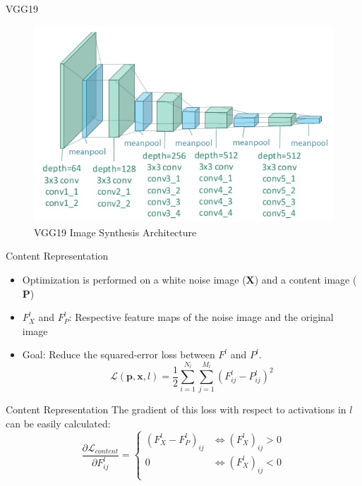 \documentclass{beamer}
\begin{document}
\begin{frame}{VGG19}
\begin{figure}[H]
\centering
\includegraphics[width=.9\textwidth]{img/vgg19/synthesis}
\caption*{ VGG19 Image Synthesis Architecture}
\end{figure}
\end{frame}

\begin{frame}{Content Representation}
    \begin{itemize}
        \item Optimization is performed on a white noise image
            ($\mathbf{X}$) and a content image
            ($\mathbf{P}$)
        \item $F_X^l$ and $F_P^l$: Respective feature maps of the
            noise image and the original image
        \item Goal: Reduce the squared-error loss between $F^l$ and $P^l$.
    \begin{equation}
        \mathcal{L}(\mathbf{p}, \mathbf{x}, l) =
        \frac{1}{2} \sum_{i=1}^{N_l}\sum_{j=1}^{M_l}{(F^l_{ij} - P^l_{ij})^2}
    \end{equation}
    \end{itemize}
\end{frame}

\begin{frame}{Content Representation}
    The gradient of this loss with respect to activations in $l$ can be easily
    calculated:
    \begin{equation}
        \frac{\partial \mathcal{L}_{content}}{\partial F^l_{ij}}
        =
        \begin{cases}
            (F^l_X - F^l_P)_{ij} & \iff (F^l_{X})_{ij} > 0 \\
            0 & \iff (F^l_{X})_{ij} < 0 \\
        \end{cases}
    \end{equation}
\end{frame}
\end{document}
